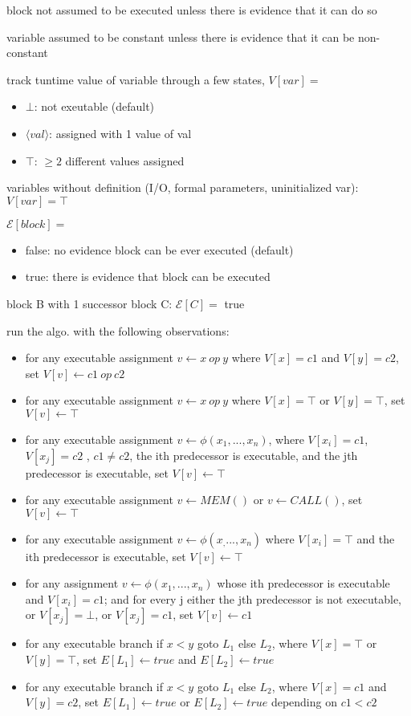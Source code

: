 \documentclass[8pt]{extarticle}
\begin{document}
\begin{multicols*}{2}
  block not assumed to be executed unless there is evidence that it can do so

  variable assumed to be constant unless there is evidence that it can be non-constant

  track tuntime value of variable through a few states, $V[var]=$
  \begin{itemize}
  \item $\bot$: not exeutable (default)
  \item $\langle val \rangle$: assigned with 1 value of val
  \item $\top$: $\geq 2$ different values assigned
  \end{itemize}
  variables without definition (I/O, formal parameters, uninitialized var): $V[var]=\top$

  $\mathcal{E}[block]=$
  \begin{itemize}
  \item false: no evidence block can be ever executed (default)
  \item true: there is evidence that block can be executed
  \end{itemize}

  block B with 1 successor block C: $\mathcal{E}[C]=$ true

  run the algo. with the following observations:

  \begin{itemize}
    \item for any executable assignment $v \leftarrow x\ op\ y$ where $V[x] = c1$ and $V[y] = c2$, set $V[v] \leftarrow c1\ op\ c2$
    \item for any executable assignment $v \leftarrow x\ op\ y$ where $V[x] = \top$ or $V[y] = \top$, set $V[v] \leftarrow \top$
    \item for any executable assignment $v \leftarrow \phi(x_1 , ..., x_n )$, where $V[x_i] = c1$, $V[x_j] = c2$ , $c1 \neq c2$, the ith predecessor is executable, and the jth predecessor is executable, set $V[v] \leftarrow \top$
    \item for any executable assignment $v \leftarrow MEM()$ or $v \leftarrow CALL()$, set $V[v] \leftarrow \top$
    \item for any executable assignment $v \leftarrow \phi(x _ , ..., x_n)$ where $V[x_i] = \top$ and the ith predecessor is executable, set $V[v] \leftarrow \top$
    \item for any assignment $v \leftarrow \phi(x_1, ..., x_n)$ whose ith predecessor is executable and $V[x_i] = c1$; and for every j either the jth predecessor is not executable, or $V[x_j] = \bot$, or $V[x_j] = c1$, set $V[v] \leftarrow c1$
    \item for any executable branch if $x < y$ goto $L_1$ else $L_2$, where $V[x] = \top$ or $V[y] = \top$, set $E[L_1] \leftarrow true$ and $E[L_2] \leftarrow true$
    \item for any executable branch if $x < y$ goto $L_1$ else $L_2$, where $V[x] = c1$ and $V[y] = c2$, set $E[L_1] \leftarrow true$ or $E[L_2] ← true$ depending on $c1 < c2$
  \end{itemize}


\end{multicols*}
\end{document}
